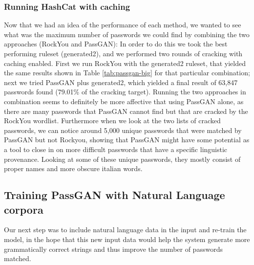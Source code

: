 \subsubsection{Running HashCat with caching}\label{subsubsec:potfile-enable}
Now that we had an idea of the performance of each method, we wanted to see what was the maximum number of passwords we could find by combining the two approaches (RockYou and PassGAN):
In order to do this we took the best performing ruleset (generated2), and we performed two rounds of cracking with caching enabled. First we run RockYou with the generated2 ruleset, that yielded the same results shown in Table \ref{tab:passgan-big} for that particular combination; next we tried PassGAN plus generated2, which yielded a final result of 63,847 passwords found (79.01\% of the cracking target). Running the two approaches in combination seems to definitely be more affective that using PassGAN alone, as there are many passwords that PassGAN cannot find but that are cracked by the RockYou wordlist.
Furthermore when we look at the two lists of cracked passwords, we can notice around 5,000 unique passwords that were matched by PassGAN but not Rockyou, showing that PassGAN might have some potential as a tool to close in on more difficult passwords that have a specific linguistic provenance. Looking at some of these unique passwords, they mostly consist of proper names and more obscure italian words.

\subsection{Training PassGAN with Natural Language corpora} \label{subsec:nl-testing}
Our next step was to include natural language data in the input and re-train the model, in the hope that this new input data would help the system generate more grammatically correct strings and thus improve the number of passwords matched.

